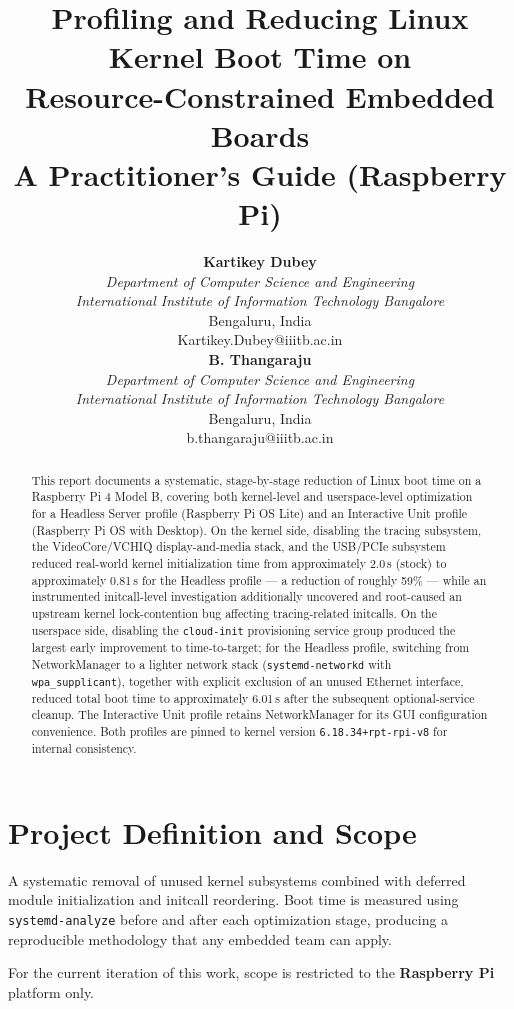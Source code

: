 \documentclass[11pt,a4paper]{article}
\title{\textbf{Profiling and Reducing Linux Kernel Boot Time on \\ Resource-Constrained Embedded Boards}\\
\large A Practitioner's Guide (Raspberry Pi)}
\author{
\begin{minipage}[t]{0.47\textwidth}
\centering
\textbf{Kartikey Dubey}\\
\textit{Department of Computer Science and Engineering}\\
\textit{International Institute of Information Technology Bangalore}\\
Bengaluru, India\\
Kartikey.Dubey@iiitb.ac.in
\end{minipage}
\hfill
\begin{minipage}[t]{0.47\textwidth}
\centering
\textbf{B. Thangaraju}\\
\textit{Department of Computer Science and Engineering}\\
\textit{International Institute of Information Technology Bangalore}\\
Bengaluru, India\\
b.thangaraju@iiitb.ac.in
\end{minipage}
}
\date{}
\begin{document}
\maketitle

\begin{abstract}
This report documents a systematic, stage-by-stage reduction of Linux boot time on a Raspberry Pi 4 Model B, covering both kernel-level and userspace-level optimization for a Headless Server profile (Raspberry Pi OS Lite) and an Interactive Unit profile (Raspberry Pi OS with Desktop). On the kernel side, disabling the tracing subsystem, the VideoCore/VCHIQ display-and-media stack, and the USB/PCIe subsystem reduced real-world kernel initialization time from approximately 2.0\,s (stock) to approximately 0.81\,s for the Headless profile — a reduction of roughly 59\% — while an instrumented initcall-level investigation additionally uncovered and root-caused an upstream kernel lock-contention bug affecting tracing-related initcalls. On the userspace side, disabling the \texttt{cloud-init} provisioning service group produced the largest early improvement to time-to-target; for the Headless profile, switching from NetworkManager to a lighter network stack (\texttt{systemd-networkd} with \texttt{wpa\_supplicant}), together with explicit exclusion of an unused Ethernet interface, reduced total boot time to approximately 6.01\,s after the subsequent optional-service cleanup. The Interactive Unit profile retains NetworkManager for its GUI configuration convenience. Both profiles are pinned to kernel version \texttt{6.18.34+rpt-rpi-v8} for internal consistency.
\end{abstract}

\tableofcontents
\newpage

\section{Project Definition and Scope}

A systematic removal of unused kernel subsystems combined with deferred module initialization and initcall reordering. Boot time is measured using \texttt{systemd-analyze} before and after each optimization stage, producing a reproducible methodology that any embedded team can apply.

For the current iteration of this work, scope is restricted to the \textbf{Raspberry Pi} platform only.

\end{document}
